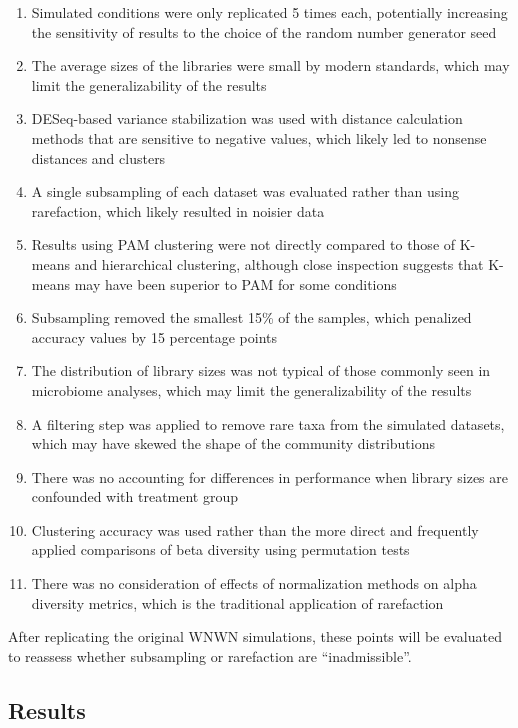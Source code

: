 \documentclass[
]{article}
\providecommand{\tightlist}{%
  \setlength{\itemsep}{0pt}\setlength{\parskip}{0pt}}
\begin{document}
\begin{enumerate}
\def\labelenumi{\arabic{enumi}.}
\tightlist
\item
  Simulated conditions were only replicated 5 times each, potentially
  increasing the sensitivity of results to the choice of the random
  number generator seed
\item
  The average sizes of the libraries were small by modern standards,
  which may limit the generalizability of the results
\item
  DESeq-based variance stabilization was used with distance calculation
  methods that are sensitive to negative values, which likely led to
  nonsense distances and clusters
\item
  A single subsampling of each dataset was evaluated rather than using
  rarefaction, which likely resulted in noisier data
\item
  Results using PAM clustering were not directly compared to those of
  K-means and hierarchical clustering, although close inspection
  suggests that K-means may have been superior to PAM for some
  conditions
\item
  Subsampling removed the smallest 15\% of the samples, which penalized
  accuracy values by 15 percentage points
\item
  The distribution of library sizes was not typical of those commonly
  seen in microbiome analyses, which may limit the generalizability of
  the results
\item
  A filtering step was applied to remove rare taxa from the simulated
  datasets, which may have skewed the shape of the community
  distributions
\item
  There was no accounting for differences in performance when library
  sizes are confounded with treatment group
\item
  Clustering accuracy was used rather than the more direct and
  frequently applied comparisons of beta diversity using permutation
  tests
\item
  There was no consideration of effects of normalization methods on
  alpha diversity metrics, which is the traditional application of
  rarefaction
\end{enumerate}

After replicating the original WNWN simulations, these points will be
evaluated to reassess whether subsampling or rarefaction are
``inadmissible''.

\hypertarget{results}{%
\subsection{Results}\label{results}}
\end{document}
